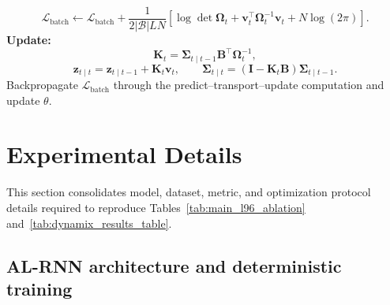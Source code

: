 \documentclass{article}
\theoremstyle{plain}
\theoremstyle{definition}
\theoremstyle{remark}
\begin{document}
\begin{algorithm}[!htpb]
\begin{algorithmic}[1]
                \[
                \mathcal L_{\mathrm{batch}}
                \leftarrow
                \mathcal L_{\mathrm{batch}}
                +
                \frac{1}{2|\mathcal B|LN}
                \left[
                \log\det\bm\Omega_t
                +
                \bm v_t^\top\bm\Omega_t^{-1}\bm v_t
                +
                N\log(2\pi)
                \right].
                \]
            \ENDIF
            \STATE \textbf{Update:}
            \[
            \bm K_t
            =
            \bm\Sigma_{t\mid t-1}\bm B^\top\bm\Omega_t^{-1},
            \]
            \[
            \bm z_{t\mid t}
            =
            \bm z_{t\mid t-1}+\bm K_t\bm v_t,
            \qquad
            \bm\Sigma_{t\mid t}
            =
            (\bm I-\bm K_t\bm B)\bm\Sigma_{t\mid t-1}.
            \]
        \ENDFOR
    \ENDFOR
    \STATE Backpropagate $\mathcal L_{\mathrm{batch}}$ through the predict--transport--update computation and update $\theta$.
\ENDFOR
\end{algorithmic}
\end{algorithm}

\section{Experimental Details}
\label{app:experimental_details}

This section consolidates model, dataset, metric, and optimization protocol details required to reproduce Tables~\ref{tab:main_l96_ablation} and~\ref{tab:dynamix_results_table}.

\subsection{AL-RNN architecture and deterministic training}
\label{app:alrnn_implementation_details}
\end{document}
